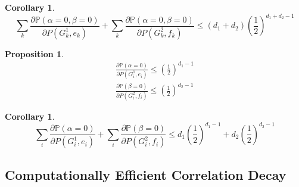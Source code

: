 \documentclass[a4paper]{article}
\newtheorem{Cor}[Thm]{Corollary}
\newtheorem{Prop}[Thm]{Proposition}
\begin{document}
	\begin{Cor}
		\[\sum_k \frac{\partial \mathbb{P}\left( \alpha = 0, \beta = 0 \right) }{ \partial P(G_k^1, e_k) } + \sum_k \frac{\partial \mathbb{P}\left( \alpha = 0, \beta = 0 \right) }{ \partial P(G_k^2, f_k) } \leq (d_1 + d_2) (\frac{1}{2})^{d_1+d_2-1}\]
	\end{Cor}

	\begin{Prop}
		\begin{align*}
			\frac{\partial \mathbb{P}\left( \alpha = 0 \right) }{ \partial P(G_i^1, e_i) } \leq (\frac{1}{2})^{d_1 -1} \\
			\frac{\partial \mathbb{P}\left( \beta = 0 \right) }{ \partial P(G_i^2, f_i) } \leq (\frac{1}{2})^{d_2 -1} 
		\end{align*}
	\end{Prop}

	\begin{Cor}
		\[ 
			\sum_i \frac{\partial \mathbb{P}\left( \alpha = 0 \right) }{ \partial P(G_i^1, e_i) } +
			\sum_i \frac{\partial \mathbb{P}\left( \beta = 0 \right) }{ \partial P(G_i^2, f_i) } \leq d_1 \left( \frac{1}{2} \right)^{d_1-1} +d_2 \left( \frac{1}{2} \right)^{d_2-1}
		\]
	\end{Cor}

	\subsection{Computationally Efficient Correlation Decay}
\end{document}
